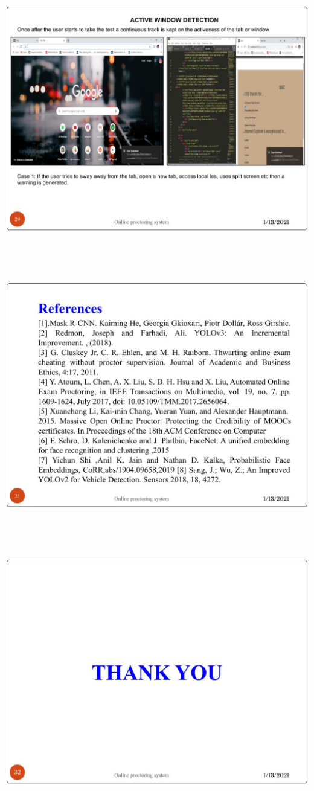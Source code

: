 \documentclass[12pt]{report}
\begin{document}
\includegraphics[width=17cm,height=12cm]{INTERNSHIP SAMPLE PRESENTATION (28)}\\
\includegraphics[width=17cm,height=12cm]{INTERNSHIP SAMPLE PRESENTATION (30)}\\
\includegraphics[width=17cm,height=12cm]{INTERNSHIP SAMPLE PRESENTATION (31)}\\
\end{document}
